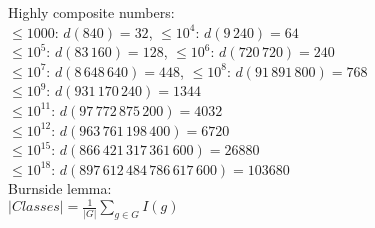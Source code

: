 Highly composite numbers: \\
$\le 1000$: $d(840)=32$, $\le 10^4$: $d(9\,240)=64$\\
$\le 10^5$: $d(83\,160)=128$, $\le 10^6$: $d(720\,720)=240$\\
$\le 10^7$: $d(8\,648\,640)=448$, $\le 10^8$: $d(91\,891\,800)=768$\\
$\le 10^9$: $d(931\,170\,240)=1344$\\
$\le 10^{11}$: $d(97\,772\,875\,200)=4032$\\
$\le 10^{12}$: $d(963\,761\,198\,400)=6720$\\
$\le 10^{15}$: $d(866\,421\,317\,361\,600)=26880$\\
$\le 10^{18}$: $d(897\,612\,484\,786\,617\,600)=103680$\\
Burnside lemma:\\
$|Classes| = \frac{1}{|G|}\sum\limits_{g\in G}I(g)$\\
